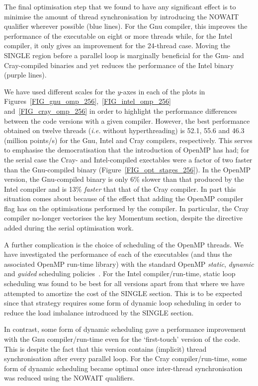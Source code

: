 \documentclass[journal]{IEEEtran}
\begin{document}
The final optimisation step that we found to have any significant
effect is to minimise the amount of thread synchronisation by
introducing the NOWAIT qualifier wherever possible (blue lines). For
the Gnu compiler, this improves the performance of the executable on
eight or more threads while, for the Intel compiler, it only gives an
improvement for the 24-thread case. Moving the SINGLE region before a
parallel loop is marginally beneficial for the Gnu- and Cray-compiled
binaries and yet reduces the performance of the Intel binary (purple
lines).

We have used different scales for the $y$-axes in each of the plots in
Figures~\ref{FIG_gnu_omp_256},~\ref{FIG_intel_omp_256}
and~\ref{FIG_cray_omp_256} in order to highlight the performance
differences between the code versions with a given compiler. However,
the best performance obtained on twelve threads ({\it i.e.}  without
hyperthreading) is 52.1, 55.6 and 46.3 (million points/s) for the Gnu,
Intel and Cray compilers, respectively. This serves to emphasise the
democratisation that the introduction of OpenMP has had; for the
serial case the Cray- and Intel-compiled exectables were a factor of
two faster than the Gnu-compiled binary
(Figure~\ref{FIG_opt_stages_256}). In the OpenMP version, the
Gnu-compiled binary is only 6\% slower than that produced by the Intel
compiler and is 13\% {\em faster} that that of the Cray compiler. In
part this situation comes about because of the effect that adding the
OpenMP compiler flag has on the optimisations performed by the
compiler.  In particular, the Cray compiler no-longer vectorises the
key Momentum section, despite the directive added during the serial
optimisation work.

A further complication is the choice of scheduling of the OpenMP
threads.  We have investigated the performance of each of the
executables (and thus the associated OpenMP run-time library) with the
standard OpenMP {\it static}, {\it dynamic} and {\it guided}
scheduling policies~\cite{openmp_standard}. For the Intel
compiler/run-time, static loop scheduling was found to be best for all
versions apart from that where we have attempted to amortize the cost
of the SINGLE section. This is to be expected since that strategy
requires some form of dynamic loop scheduling in order to reduce the
load imbalance introduced by the SINGLE section.

In contrast, some form of dynamic scheduling gave a performance
improvement with the Gnu compiler/run-time even for the `first-touch'
version of the code. This is despite the fact that this version
contains (implicit) thread synchronisation after every parallel loop.
For the Cray compiler/run-time, some form of dynamic scheduling became
optimal once inter-thread synchronisation was reduced using the NOWAIT
qualifiers.
\end{document}
